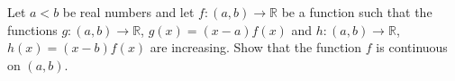 Let $a < b$ be real numbers and let $f : (a, b) \to \mathbb{R}$ be a function such that the functions $g : (a, b) \to \mathbb{R}$, $g(x) = (x - a) f(x)$ and $h : (a, b) \to \mathbb{R}$, $h(x) = (x - b) f(x)$ are increasing. Show that the function $f$ is continuous on $(a, b)$.